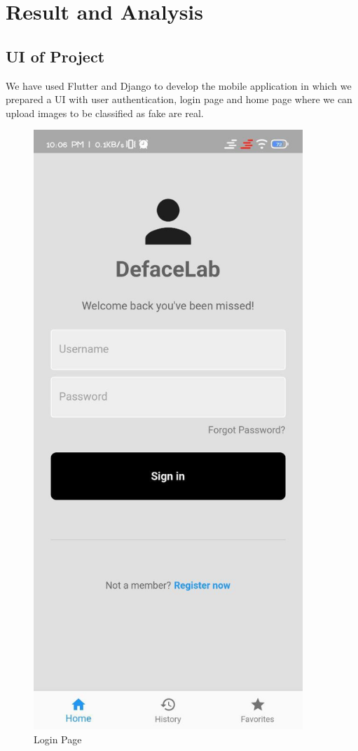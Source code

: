 \section{Result and Analysis}
\subsection{UI of Project}
We have used Flutter and Django to develop the mobile application in which we prepared a
UI with user authentication, login page and home page where we can upload images to be classified as fake are real.

\begin{figure}[ht]
    \centering
    \includegraphics[width= 4in, height =7 in ]{img/loginpage.jpg}
    \caption{Login Page }
\end{figure}

